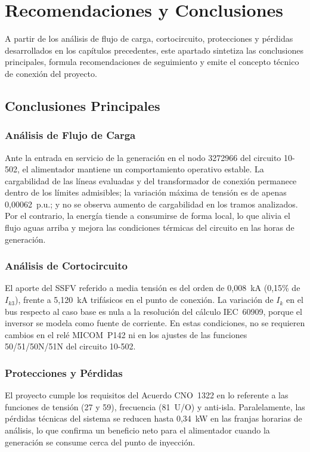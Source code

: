 \chapter{Recomendaciones y Conclusiones}

A partir de los análisis de flujo de carga, cortocircuito, protecciones y pérdidas desarrollados en los capítulos precedentes, este apartado sintetiza las conclusiones principales, formula recomendaciones de seguimiento y emite el concepto técnico de conexión del proyecto.

\section{Conclusiones Principales}

\subsection{Análisis de Flujo de Carga}

Ante la entrada en servicio de la generación en el nodo 3272966 del circuito 10-502, el alimentador mantiene un comportamiento operativo estable. La cargabilidad de las líneas evaluadas y del transformador de conexión permanece dentro de los límites admisibles; la variación máxima de tensión es de apenas 0,00062~p.u.; y no se observa aumento de cargabilidad en los tramos analizados. Por el contrario, la energía tiende a consumirse de forma local, lo que alivia el flujo aguas arriba y mejora las condiciones térmicas del circuito en las horas de generación.

\subsection{Análisis de Cortocircuito}

El aporte del SSFV referido a media tensión es del orden de 0,008~kA (0,15\% de $I_{k3}$), frente a 5,120~kA trifásicos en el punto de conexión. La variación de $I_k$ en el bus respecto al caso base es nula a la resolución del cálculo IEC~60909, porque el inversor se modela como fuente de corriente. En estas condiciones, no se requieren cambios en el relé MICOM~P142 ni en los ajustes de las funciones 50/51/50N/51N del circuito 10-502.

\subsection{Protecciones y Pérdidas}

El proyecto cumple los requisitos del Acuerdo CNO~1322 en lo referente a las funciones de tensión (27 y 59), frecuencia (81~U/O) y anti-isla. Paralelamente, las pérdidas técnicas del sistema se reducen hasta 0,34~kW en las franjas horarias de análisis, lo que confirma un beneficio neto para el alimentador cuando la generación se consume cerca del punto de inyección.

